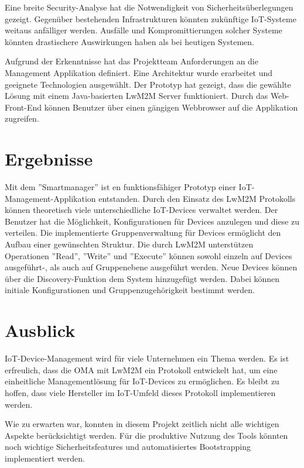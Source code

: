 Eine breite Security-Analyse hat die Notwendigkeit von Sicherheitsüberlegungen gezeigt. Gegenüber bestehenden Infrastrukturen könnten zukünftige IoT-Systeme weitaus anfälliger werden. Ausfälle und Kompromittierungen solcher Systeme könnten drastischere Auswirkungen haben als bei heutigen Systemen. 

Aufgrund der Erkenntnisse hat das Projektteam Anforderungen an die Management Applikation definiert. Eine Architektur wurde erarbeitet und geeignete Technologien ausgewählt. Der Prototyp hat gezeigt, dass die gewählte Lösung mit einem Java-basierten LwM2M Server funktioniert. Durch das Web-Front-End können Benutzer über einen gängigen Webbrowser auf die Applikation zugreifen.
\section*{Ergebnisse}
Mit dem ''Smartmanager'' ist en funktionsfähiger Prototyp einer IoT-Management-Applikation entstanden. Durch den Einsatz des LwM2M Protokolls können theoretisch viele unterschiedliche IoT-Devices verwaltet werden. Der Benutzer hat die Möglichkeit, Konfigurationen für Devices anzulegen und diese zu verteilen. Die implementierte Gruppenverwaltung für Devices ermöglicht den Aufbau einer gewünschten Struktur. Die durch LwM2M unterstützen Operationen ''Read'', ''Write'' und ''Execute'' können sowohl einzeln auf Devices ausgeführt-, als auch auf Gruppenebene ausgeführt werden. Neue Devices können über die Discovery-Funktion dem System hinzugefügt werden. Dabei können initiale Konfigurationen und Gruppenzugehörigkeit bestimmt werden.
\section*{Ausblick}
IoT-Device-Management wird für viele Unternehmen ein Thema werden. Es ist erfreulich, dass die OMA mit LwM2M ein Protokoll entwickelt hat, um eine einheitliche Managementlösung für IoT-Devices zu ermöglichen. Es bleibt zu hoffen, dass viele Hersteller im IoT-Umfeld dieses Protokoll implementieren werden.

Wie zu erwarten war, konnten in diesem Projekt zeitlich nicht alle wichtigen Aspekte berücksichtigt werden. Für die produktive Nutzung des Tools könnten noch wichtige Sicherheitsfeatures und automatisiertes Bootstrapping implementiert werden.